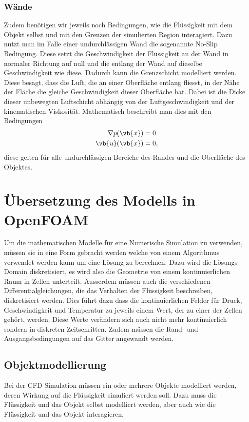 \subsubsection{Wände}
Zudem benötigen wir jeweils noch Bedingungen, wie die Flüssigkeit mit dem Objekt selbst und mit den Grenzen der simulierten Region interagiert.
Dazu nutzt man im Falle einer undurchlässigen Wand die sogenannte No-Slip Bedingung. 
Diese setzt die Geschwindigkeit der Flüssigkeit an der Wand in normaler Richtung auf null und die entlang der Wand auf dieselbe Geschwindigkeit wie diese.
Dadurch kann die Grenzschicht modelliert werden. Diese besagt, dass die Luft, die an einer Oberfläche entlang fliesst, in der Nähe der Fläche die gleiche Geschwindigkeit dieser Oberfläche hat.
Dabei ist die Dicke dieser unbewegten Luftschicht abhängig von der Luftgeschwindigkeit und der kinematischen Viskosität.
Mathematisch beschreibt man dies mit den Bedingungen
\begin{align*}
 \nabla p(\vb{x}) &= 0 \\
\vb{u}(\vb{x}) &= 0 ,\\
\end{align*}
diese gelten für alle undurchlässigen Bereiche des Randes und die Oberfläche des Objektes.

\section{Übersetzung des Modells in OpenFOAM}
Um die mathematischen Modelle für eine Numerische Simulation zu verwenden, müssen sie in eine Form gebracht werden welche von einem Algorithmus verwendet werden kann um eine Lösung zu berechnen.
Dazu wird die Lösungs-Domain diskretisiert, es wird also die Geometrie von einem kontinuierlichen Raum in Zellen unterteilt.
Ausserdem müssen auch die verschiedenen Differentialgleichungen, die das Verhalten der Flüssigkeit beschreiben, diskretisiert werden.
Dies führt dazu dass die kontinuierlichen Felder für Druck, Geschwindigkeit und Temperatur zu jeweils einem Wert, der zu einer der Zellen gehört, werden.
Diese Werte verändern sich auch nicht mehr kontinuierlich sondern in diskreten Zeitschritten.
Zudem müssen die Rand- und Ausgangsbedingungen auf das Gitter angewandt werden.


\subsection{Objektmodellierung}
Bei der CFD Simulation müssen ein oder mehrere Objekte modelliert werden, deren Wirkung auf die Flüssigkeit simuliert werden soll. 
Dazu muss die Flüssigkeit und das Objekt selbst modelliert werden, aber auch wie die Flüssigkeit und das Objekt interagieren.

